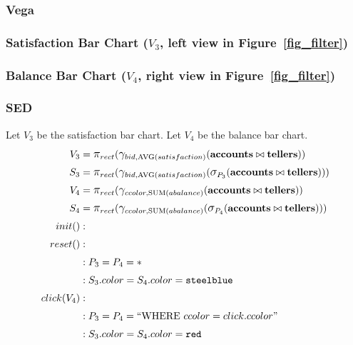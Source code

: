 \subsubsection{Vega}
\subsubsection*{Satisfaction Bar Chart ($V_3$, left view in Figure~\ref{fig_filter})}

\subsubsection*{Balance Bar Chart ($V_4$, right view in Figure~\ref{fig_filter})}

\subsubsection{SED}
Let $V_3$ be the satisfaction bar chart.
Let $V_4$ be the balance bar chart.
\begin{align*}
	V_3&= \mathlarger{\pi}_{rect}(\mathlarger{\gamma}_{bid, \text{AVG}(satisfaction)}(\bf{accounts}\bowtie{}\bf{tellers}))\\
	S_3&= \mathlarger{\pi}_{rect}(\mathlarger{\gamma}_{bid, \text{AVG}(satisfaction)}(\mathlarger{\sigma}_{P_3}(\bf{accounts}\bowtie{}\bf{tellers})))\\
	V_4&= \mathlarger{\pi}_{rect}(\mathlarger{\gamma}_{ccolor, \text{SUM}(abalance)}(\bf{accounts}\bowtie{}\bf{tellers}))\\
	S_4&= \mathlarger{\pi}_{rect}(\mathlarger{\gamma}_{ccolor, \text{SUM}(abalance)}(\mathlarger{\sigma}_{P_4}(\bf{accounts}\bowtie{}\bf{tellers})))\\
	init()&:\\
	reset()&:\\
	&: P_3 = P_4 = *\\
	&: S_3.color = S_4.color = \texttt{steelblue}\\
	click(V_4)&:\\
	&: P_3 = P_4 = ``\text{WHERE}~ccolor=click.ccolor"\\
	&: S_3.color = S_4.color = \texttt{red}\\
\end{align*}
